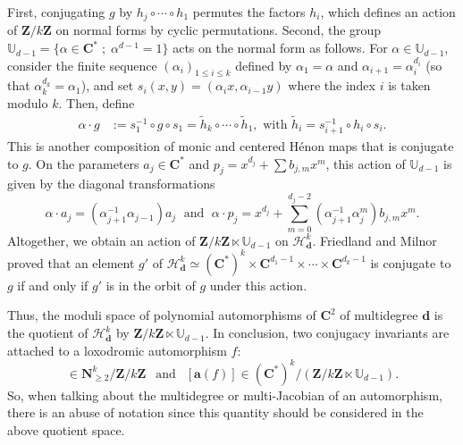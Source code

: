 \documentclass[oneside, 12pt]{amsart}
\newcommand{\lrpar}[1]{\left(#1\right)}
\newcommand{\inv}{^{-1}}
\newcommand{\C}{\mathbf{C}}
\newcommand{\Z}{\mathbf{Z}}
\newcommand{\N}{\mathbf{N}}
\theoremstyle{plain}
\theoremstyle{definition}
\numberwithin{equation}{section}       %
\numberwithin{equation}{section}       %
\begin{document}
First, conjugating $g$ by  $h_j\circ\cdots \circ h_1$ permutes the factors $h_i$, 
which defines an action of $\Z/k\Z$ on normal forms by cyclic permutations. 
Second, the group $\mathbb{U}_{d-1}=\{\alpha\in \C^* \; ; \; \alpha^{d-1}=1\}$ acts on the normal form as follows.
For  $\alpha\in \mathbb{U}_{d-1}$, consider the finite sequence $(\alpha_i)_{1\leq i\leq k}$  defined  by $\alpha_1 = \alpha$ and 
$\alpha_{i+1} = \alpha_i^{d_i}$  (so that $\alpha_k^{d_k} = \alpha_1$),
and set $s_i(x,y) = (\alpha_ix , \alpha_{i-1}y)$ where the  index $i$ is taken modulo $k$. 
Then, define
\begin{align}\label{eq:alphaf}
\alpha\cdot g &:=  
  s_1 \inv\circ g \circ s_1 = \tilde h_k\circ \cdots \circ \tilde h_1, \text{ with }  \tilde h_i = s_{i+1}\inv \circ  h_i \circ s_i.
\end{align}
This is another composition of monic and centered Hénon maps that is conjugate to $g$. 
On the parameters $a_j\in \C^*$ and $p_j=x^{d_j}+\sum b_{j,m}x^m$, this action of $\mathbb{U}_{d-1}$ is given by the diagonal transformations
\begin{equation}
\label{eq:alpha_conjugation}
\alpha\cdot a_j  = (\alpha_{j+1}\inv\alpha_{j-1}) a_j \; \text{ and } \; 
\alpha\cdot p_j =x^{d_j}+\sum_{m=0}^{d_j-2}  (\alpha_{j+1}\inv\alpha_j^m)b_{j,m}x^m.
\end{equation}
Altogether, we obtain an action of $\Z/k\Z\ltimes   \mathbb{U}_{d-1}$ on $\mathcal H^k_{\mathbf d}$. 
Friedland and Milnor proved that an element $g'$ of $\mathcal H^k_{\mathbf d}\simeq (\C^*)^k\times   \C^{d_1-1}\times \cdots \times \C^{d_k-1}$
is conjugate to $g$ if and only if $g'$ is in the orbit of $g$ under this action. 


Thus, the moduli space of polynomial automorphisms of $\C^2$ of multidegree 
$\mathbf d$ is the quotient of $\mathcal H^k_{\mathbf d}$ by $\Z/k\Z\ltimes   \mathbb{U}_{d-1}$. 
In conclusion, two conjugacy invariants are attached to a loxodromic automorphism $f$:
\begin{equation}
[\mathbf{d}(f)] \in \N_{\geq 2}^k/\Z/k\Z \;\, {\text{ and }} \;\, [\mathbf{a}(f)]\in (\C^*)^k / (\Z/k\Z\ltimes   \mathbb{U}_{d-1}).
\end{equation}
So, when talking about the multidegree or multi-Jacobian of an automorphism, there is an abuse of notation since this quantity should be considered in the above quotient space. 
\end{document}
